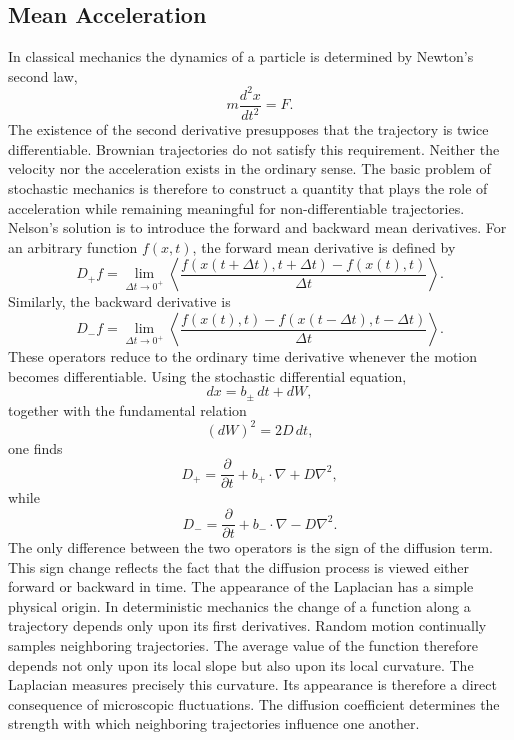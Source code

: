\subsection{Mean Acceleration}
In classical mechanics the dynamics of a particle is determined by
Newton's second law,
\begin{equation}
m\frac{d^2x}{dt^2}=F.
\label{eq:newton}
\end{equation}
The existence of the second derivative presupposes that the trajectory
is twice differentiable.
Brownian trajectories do not satisfy this requirement.
Neither the velocity nor the acceleration exists in the ordinary sense.
The basic problem of stochastic mechanics is therefore to construct a
quantity that plays the role of acceleration while remaining meaningful
for non-differentiable trajectories.
Nelson's solution is to introduce the forward and backward mean
derivatives.
For an arbitrary function $f(x,t)$, the forward mean derivative is
defined by
\begin{equation}
D_{+}f=\lim_{\Delta t\rightarrow0^{+}}
\left<\frac{f(x(t+\Delta t),t+\Delta t)-f(x(t),t)}{\Delta t}\right>.
\label{eq:Dplus}
\end{equation}
Similarly, the backward derivative is
\begin{equation}
D_{-}f=\lim_{\Delta t\rightarrow0^{+}}
\left<\frac{f(x(t),t)-f(x(t-\Delta t),t-\Delta t)}{\Delta t}\right>.
\label{eq:Dminus}
\end{equation}
These operators reduce to the ordinary time derivative whenever the
motion becomes differentiable.
Using the stochastic differential equation,
\[dx=b_{\pm}\,dt+dW,\]
together with the fundamental relation
\[(dW)^2=2D\,dt,\]
one finds
\begin{equation}
\boxed{D_{+}=\frac{\partial}{\partial t}+b_{+}\cdot\nabla+D\nabla^2,}
\label{eq:Dplusoperator}
\end{equation}
while
\begin{equation}
\boxed{D_{-}=\frac{\partial}{\partial t}+b_{-}\cdot\nabla-D\nabla^2.}
\label{eq:Dminusoperator}
\end{equation}
The only difference between the two operators is the sign of the
diffusion term.
This sign change reflects the fact that the diffusion process is viewed
either forward or backward in time.
The appearance of the Laplacian has a simple physical origin.
In deterministic mechanics the change of a function along a trajectory
depends only upon its first derivatives.
Random motion continually samples neighboring trajectories.
The average value of the function therefore depends not only upon its
local slope but also upon its local curvature.
The Laplacian measures precisely this curvature.
Its appearance is therefore a direct consequence of microscopic
fluctuations.
The diffusion coefficient determines the strength with which neighboring
trajectories influence one another.

